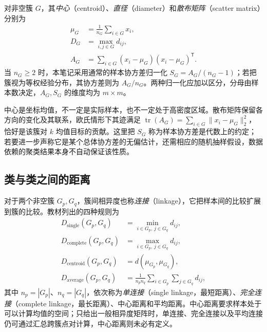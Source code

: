 \begin{definition}
\label{def:lh-cluster-statistics}
对非空簇 $G$，其\emph{中心}（centroid）、\emph{直径}（diameter）和\emph{散布矩阵}（scatter matrix）分别为
\begin{align}
\mu_G&=\frac1{n_G}\sum_{i\in G}x_i,
\label{eq:lh-cluster-centroid}\\
D_G&=\max_{i,j\in G}d_{ij},
\label{eq:lh-cluster-diameter}\\
A_G&=\sum_{i\in G}(x_i-\mu_G)(x_i-\mu_G)^{\mathsf T}.
\label{eq:lh-cluster-scatter}
\end{align}
当 $n_G\geq2$ 时，本笔记采用通常的样本协方差归一化 $S_G=A_G/(n_G-1)$；若把簇视为等权经验分布，其协方差则为 $A_G/n_G$。两种归一化应加以区分，分母由样本数决定，$A_G,S_G$ 的维度均为 $m\times m$。
\end{definition}

中心是坐标均值，不一定是实际样本，也不一定处于高密度区域。散布矩阵保留各方向的变化及其联系，欧氏情形下其迹满足 $\operatorname{tr}(A_G)=\sum_{i\in G}\|x_i-\mu_G\|_2^2$，恰好是该簇对 $k$ 均值目标的贡献。这里把 $S_G$ 称为样本协方差是代数上的约定；若要进一步声称它是某个总体协方差的无偏估计，还需相应的随机抽样假设，数据依赖的聚类结果本身不自动保证该性质。

\subsection{类与类之间的距离}
\label{subsec:lh-cluster-linkage}

对于两个非空簇 $G_p,G_q$，簇间相异度也称\emph{连接}（linkage），它把样本间的比较扩展到簇的比较。教材列出的四种规则为
\begin{align}
D_{\mathrm{single}}(G_p,G_q)&=\min_{i\in G_p,\,j\in G_q}d_{ij},
\label{eq:lh-cluster-single-linkage}\\
D_{\mathrm{complete}}(G_p,G_q)&=\max_{i\in G_p,\,j\in G_q}d_{ij},
\label{eq:lh-cluster-complete-linkage}\\
D_{\mathrm{centroid}}(G_p,G_q)&=d(\mu_{G_p},\mu_{G_q}),
\label{eq:lh-cluster-centroid-linkage}\\
D_{\mathrm{average}}(G_p,G_q)&=\frac1{n_pn_q}\sum_{i\in G_p}\sum_{j\in G_q}d_{ij},
\label{eq:lh-cluster-average-linkage}
\end{align}
其中 $n_p=|G_p|$、$n_q=|G_q|$，依次称为\emph{单连接}（single linkage，最短距离）、\emph{完全连接}（complete linkage，最长距离）、中心距离和平均距离。中心距离要求样本处于可以计算均值的空间；只给出一般相异度矩阵时，单连接、完全连接以及平均连接仍可通过汇总跨簇点对计算，中心距离则未必有定义。


